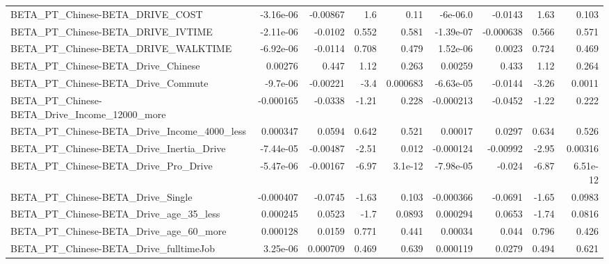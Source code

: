 \begin{tabular}{lrrrrrrrr}
BETA\_PT\_Chinese-BETA\_DRIVE\_COST                    &   -3.16e-06 &     -0.00867 &      1.6 &     0.11 &   -6e-06.0 &     -0.0143 &         1.63 &         0.103 \\
BETA\_PT\_Chinese-BETA\_DRIVE\_IVTIME                  &   -2.11e-06 &      -0.0102 &    0.552 &    0.581 &  -1.39e-07 &   -0.000638 &        0.566 &         0.571 \\
BETA\_PT\_Chinese-BETA\_DRIVE\_WALKTIME                &   -6.92e-06 &      -0.0114 &    0.708 &    0.479 &   1.52e-06 &      0.0023 &        0.724 &         0.469 \\
BETA\_PT\_Chinese-BETA\_Drive\_Chinese                 &     0.00276 &        0.447 &     1.12 &    0.263 &    0.00259 &       0.433 &         1.12 &         0.264 \\
BETA\_PT\_Chinese-BETA\_Drive\_Commute                 &    -9.7e-06 &     -0.00221 &     -3.4 & 0.000683 &  -6.63e-05 &     -0.0144 &        -3.26 &        0.0011 \\
BETA\_PT\_Chinese-BETA\_Drive\_Income\_12000\_more       &   -0.000165 &      -0.0338 &    -1.21 &    0.228 &  -0.000213 &     -0.0452 &        -1.22 &         0.222 \\
BETA\_PT\_Chinese-BETA\_Drive\_Income\_4000\_less        &    0.000347 &       0.0594 &    0.642 &    0.521 &    0.00017 &      0.0297 &        0.634 &         0.526 \\
BETA\_PT\_Chinese-BETA\_Drive\_Inertia\_Drive           &   -7.44e-05 &     -0.00487 &    -2.51 &    0.012 &  -0.000124 &    -0.00992 &        -2.95 &       0.00316 \\
BETA\_PT\_Chinese-BETA\_Drive\_Pro\_Drive               &   -5.47e-06 &     -0.00167 &    -6.97 &  3.1e-12 &  -7.98e-05 &      -0.024 &        -6.87 &      6.51e-12 \\
BETA\_PT\_Chinese-BETA\_Drive\_Single                  &   -0.000407 &      -0.0745 &    -1.63 &    0.103 &  -0.000366 &     -0.0691 &        -1.65 &        0.0983 \\
BETA\_PT\_Chinese-BETA\_Drive\_age\_35\_less             &    0.000245 &       0.0523 &     -1.7 &   0.0893 &   0.000294 &      0.0653 &        -1.74 &        0.0816 \\
BETA\_PT\_Chinese-BETA\_Drive\_age\_60\_more             &    0.000128 &       0.0159 &    0.771 &    0.441 &    0.00034 &       0.044 &        0.796 &         0.426 \\
BETA\_PT\_Chinese-BETA\_Drive\_fulltimeJob             &    3.25e-06 &     0.000709 &    0.469 &    0.639 &   0.000119 &      0.0279 &        0.494 &         0.621 \\

\end{tabular}
